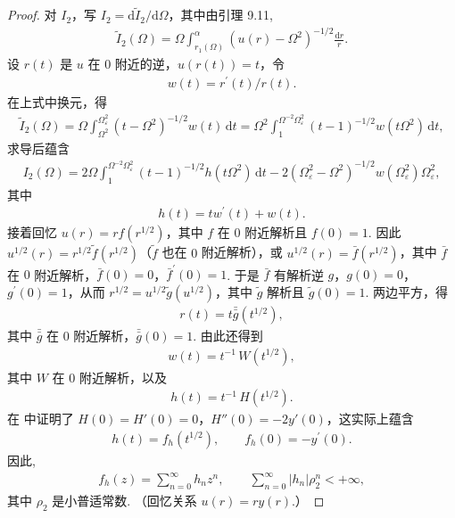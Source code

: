 \begin{proof}
对 $I_2$，写 $I_2 = \mathrm{d}\tilde{I}_2/\mathrm{d}\Omega$，其中由引理 9.11,
\begin{align*}
  \tilde{I}_{2}(\Omega)=\Omega\int_{r_{1}(\Omega)}^{\alpha}\left(u(r)-\Omega^{2}\right)^{-1/2}\frac{\mathrm{d}r}{r}.
\end{align*}
设 $r(t)$ 是 $u$ 在 $0$ 附近的逆，$u(r(t)) = t$，令
\begin{align*}
  w(t)=r^{\prime}(t)/r(t).
\end{align*}
在上式中换元，得
\begin{align*}
  \tilde{I}_{2}(\Omega)=\Omega\int_{\Omega^{2}}^{\Omega_{\varepsilon}^{2}}(t-\Omega^{2})^{-1/2}w(t)\,\mathrm{d}t
  =\Omega^{2}\int_{1}^{\Omega^{-2}\Omega_{\varepsilon}^{2}}(t-1)^{-1/2}w(t\Omega^{2})\,\mathrm{d}t,
\end{align*}
求导后蕴含
\begin{align*}
  I_{2}(\Omega)=2\Omega\int_{1}^{\Omega^{-2}\Omega_{\varepsilon}^{2}}(t-1)^{-1/2}h(t\Omega^{2})\,\mathrm{d}t
  -2\left(\Omega_{\varepsilon}^{2}-\Omega^{2}\right)^{-1/2}w(\Omega_{\varepsilon}^{2})\Omega_{\varepsilon}^{2},
\end{align*}
其中
\begin{align*}
  h(t)=t w^{\prime}(t)+w(t).
\end{align*}
接着回忆 $u(r)=rf(r^{1/2})$，其中 $f$ 在 $0$ 附近解析且 $f(0)=1$. 因此 $u^{1/2}(r)=r^{1/2}\tilde{f}(r^{1/2})$（$\tilde{f}$ 也在 $0$ 附近解析），或 $u^{1/2}(r)=\bar{f}(r^{1/2})$，其中 $\bar{f}$ 在 $0$ 附近解析，$\bar{f}(0)=0$，$\bar{f}^{\prime}(0)=1$. 于是 $\bar{f}$ 有解析逆 $g$，$g(0)=0$，$g^{\prime}(0)=1$，从而 $r^{1/2}=u^{1/2}\tilde{g}(u^{1/2})$，其中 $\tilde{g}$ 解析且 $\tilde{g}(0)=1$. 两边平方，得
\begin{align*}
  r(t)=t\bar{\bar{g}}(t^{1/2}),
\end{align*}
其中 $\bar{\bar{g}}$ 在 $0$ 附近解析，$\bar{\bar{g}}(0) = 1$. 由此还得到
\begin{align*}
  w(t)=t^{-1}\,W(t^{1/2}),
\end{align*}
其中 $W$ 在 $0$ 附近解析，以及
\begin{align*}
  h(t)=t^{-1}\,H(t^{1/2}).
\end{align*}
在 \cite{b208} 中证明了 $H(0) = H'(0) = 0$，$H''(0) = -2y'(0)$，这实际上蕴含
\begin{align*}
  h(t)=f_{h}(t^{1/2}),\qquad f_{h}(0)=-y^{\prime}(0).
\end{align*}
因此,
\begin{align*}
  f_{h}(z)=\sum_{n=0}^{\infty}h_{n}z^{n},\qquad
  \sum_{n=0}^{\infty}\left|h_{n}\right|\rho_{2}^{n}<+\infty,
\end{align*}
其中 $\rho_{2}$ 是小普适常数. （回忆关系 $u(r)=ry(r)$.）


\end{proof}
